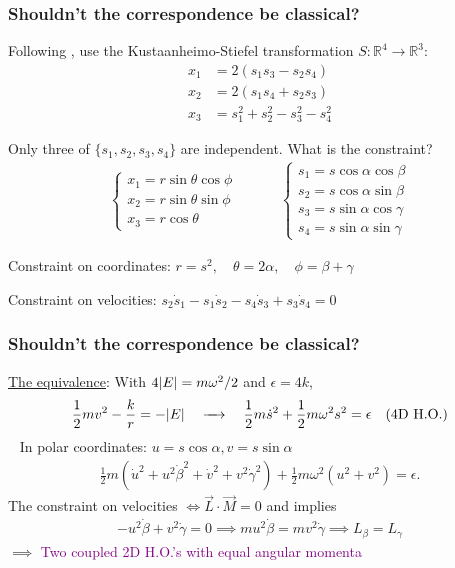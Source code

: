 \documentclass{beamer}
\theoremstyle{definition}
\newcommand{\f}[2]{\frac{#1}{#2}}
\newcommand{\be}{\beta}
\begin{document}
\begin{frame}
\frametitle{Shouldn't the correspondence be classical?}


Following \cite{chen1987coulomb}, use the Kustaanheimo-Stiefel transformation $S: \mathbb{R}^4\to \mathbb{R}^3$:
\begin{align*}
x_1 &= 2(s_1s_3 - s_2s_4) \\
x_2 &= 2(s_1s_4+s_2s_3) \\ 
x_3 &= s_1^2 + s_2^2 - s_3^2 - s_4^2
\end{align*}

\pause 

Only three of $\{ s_1,s_2,s_3,s_4 \}$ are independent. What is the constraint? \pause
\begin{align*}
\begin{cases*}
x_1 = r \sin\theta\cos \phi \\ 
x_2 = r \sin\theta\sin \phi \\ 
x_3 = r\cos\theta
\end{cases*}
\quad\quad\quad 
\begin{cases*}
s_1 = s\cos\alpha \cos\beta \\ 
s_2 = s\cos\alpha \sin\beta \\
s_3 = s\sin\alpha \cos\gamma \\ 
s_4 = s\sin\alpha \sin\gamma
\end{cases*}
\end{align*}

\pause 
Constraint on coordinates: $r = s^2,\quad  \theta = 2 \alpha, \quad \phi = \be + \gamma$

\pause 
Constraint on velocities: $s_2\dot{s}_1 - s_1 \dot{s}_2 - s_4 \dot{s}_3 + s_3 \dot{s}_4 = 0$

\end{frame}



\begin{frame}
\frametitle{Shouldn't the correspondence be classical?}

\underline{The equivalence}: With $4\abs{E} = m\omega^2/2 $ and $\epsilon = 4k$,
\begin{align*}
\f{1}{2} mv^2  - \f{k}{r} = -\abs{E} 
\quad \xrightarrow{\quad} \quad
\f{1}{2} m \dot{s}^2 + \f{1}{2} m\omega^2 s^2 = \epsilon \quad \text{(4D H.O.)}
\end{align*}
\,\,\,
\pause 
In polar coordinates: \pause $u = s \cos\alpha, v = s\sin\alpha$
\begin{align*}
\f{1}{2}m (\dot{u}^2 + u^2 \dot{\beta}^2 + \dot{v}^2 + v^2 \dot{\gamma}^2 ) + \f{1}{2} m\omega^2 (u^2 + v^2) = \epsilon.
\end{align*}
\pause 
The constraint on velocities $\iff \vec{L} \cdot \vec{M} = 0$ \pause and implies
\begin{align*}
 -u^2 \dot{\be} + v^2 \dot{\gamma} = 0 \implies  
 mu^2\dot{\be} = m v^2 \dot{\gamma} 
 \implies   L_\be = L_\gamma
\end{align*}
\pause 
$\implies$ \textcolor{purple}{Two coupled 2D H.O.'s with equal angular momenta}
\end{frame}
\end{document}
